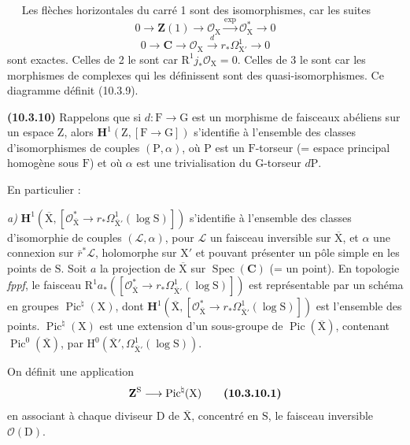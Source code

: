 \documentclass[11pt,leqno]{article}
\newcommand{\Page}[1]{\ifvmode\noindent\else\unskip\ \fi{\footnotesize\textcolor{gray}{[p.\,#1]}}\ \ignorespaces}
\begin{document}
\Page{72}
Les flèches horizontales du carré 1 sont des isomorphismes, car les suites
\[
0\longrightarrow\mathbf{Z}(1)
\longrightarrow\mathcal{O}_{\mathrm{X}}
\xrightarrow{\exp}\mathcal{O}_{\mathrm{X}}^{*}
\longrightarrow0
\]
\[
0\longrightarrow\mathbf{C}
\longrightarrow\mathcal{O}_{\mathrm{X}}
\xrightarrow{d}r_*\Omega^{1}_{\mathrm{X}'}
\longrightarrow0
\]
sont exactes. Celles de 2 le sont car \(\mathrm{R}^{1}j_*\mathcal{O}_{\mathrm{X}}=0\). Celles de 3 le sont car les morphismes de complexes qui les définissent sont des quasi-isomorphismes. Ce diagramme définit (10.3.9).

\textbf{(10.3.10)} Rappelons que si \(d:\mathrm{F}\to\mathrm{G}\) est un morphisme de faisceaux abéliens sur un espace \(\mathrm{Z}\), alors \(\mathbf{H}^{1}(\mathrm{Z},[\mathrm{F}\to\mathrm{G}])\) s’identifie à l’ensemble des classes d’isomorphismes de couples \((\mathrm{P},\alpha)\), où \(\mathrm{P}\) est un \(\mathrm{F}\)-torseur (= espace principal homogène sous \(\mathrm{F}\)) et où \(\alpha\) est une trivialisation du \(\mathrm{G}\)-torseur \(d\mathrm{P}\).

En particulier :

\textit{a)} \(\mathbf{H}^{1}(\overline{\mathrm{X}},[\mathcal{O}_{\overline{\mathrm{X}}}^{*}\to r_*\Omega^{1}_{\overline{\mathrm{X}}'}(\log\mathrm{S})])\) s’identifie à l’ensemble des classes d’isomorphie de couples \((\mathcal{L},\alpha)\), pour \(\mathcal{L}\) un faisceau inversible sur \(\overline{\mathrm{X}}\), et \(\alpha\) une connexion sur \(\bar r^{*}\mathcal{L}\), holomorphe sur \(\mathrm{X}'\) et pouvant présenter un pôle simple en les points de \(\mathrm{S}\). Soit \(a\) la projection de \(\overline{\mathrm{X}}\) sur \(\operatorname{Spec}(\mathbf{C})\) (= un point). En topologie \textit{fppf}, le faisceau \(\mathrm{R}^{1}a_*([\mathcal{O}_{\overline{\mathrm{X}}}^{*}\to r_*\Omega^{1}_{\overline{\mathrm{X}}'}(\log\mathrm{S})])\) est représentable par un schéma en groupes \(\operatorname{Pic}^{\natural}(\mathrm{X})\), dont \(\mathbf{H}^{1}(\overline{\mathrm{X}},[\mathcal{O}_{\overline{\mathrm{X}}}^{*}\to r_*\Omega^{1}_{\overline{\mathrm{X}}'}(\log\mathrm{S})])\) est l’ensemble des points. \(\operatorname{Pic}^{\natural}(\mathrm{X})\) est une extension d’un sous-groupe de \(\operatorname{Pic}(\overline{\mathrm{X}})\), contenant \(\operatorname{Pic}^{0}(\overline{\mathrm{X}})\), par \(\mathrm{H}^{0}(\overline{\mathrm{X}}',\Omega^{1}_{\overline{\mathrm{X}}'}(\log\mathrm{S}))\).

On définit une application
\[
\mathbf{Z}^{\mathrm{S}}\longrightarrow\operatorname{Pic}^{\natural}(\mathrm{X})
\tag*{\textbf{(10.3.10.1)}}
\]
en associant à chaque diviseur \(\mathrm{D}\) de \(\overline{\mathrm{X}}\), concentré en \(\mathrm{S}\), le faisceau inversible \(\mathcal{O}(\mathrm{D})\).
\end{document}
